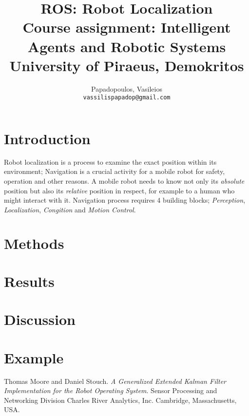 \documentclass[10pt,a4paper,twocolumn]{article}
\title{%
	ROS: Robot Localization \\
	\large Course assignment: Intelligent Agents and Robotic Systems \\
	University of Piraeus, Demokritos}
\author{
	Papadopoulos, Vasileios\\
	\texttt{vassilispapadop@gmail.com}
}
\begin{document}
\maketitle
	
\section{Introduction}
Robot localization is a process to examine the exact position within its environment; Navigation is a crucial activity for a mobile robot for safety, operation and other reasons. A mobile robot needs to know not only its \textit{absolute} position but also its \textit{relative} position in respect, for example to a human who might interact with it. Navigation process requires 4 building blocks; \textit{Perception}, \textit{Localization}, \textit{Congition} and \textit{Motion Control}.


\section{Methods}
	
\section{Results}

\section{Discussion}

\section{Example}

\begin{thebibliography}{9}
	Thomas Moore and Daniel Stouch. 
	\textit{A Generalized Extended Kalman Filter Implementation for the Robot Operating System}. 
	Sensor Processing and Networking Division Charles River Analytics, Inc. Cambridge, Massachusetts, USA.	
	
\end{thebibliography}


	
\end{document}
